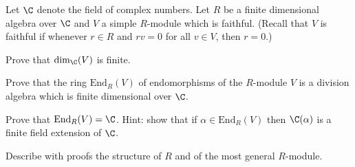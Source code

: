 Let $\C$ denote the field of complex numbers. Let $R$ be a finite
dimensional algebra over $\C$ and $V$ a simple $R$-module which is
faithful. (Recall that $V$ is faithful if whenever $r\in R$ and $rv=0$
for all $v\in V$, then $r=0$.)
\begin{alist}
\item Prove that $\dim_{\C}(V)$ is finite.
\item Prove that the ring $\text{End}_{R}(V)$ of endomorphisms of the
$R$-module $V$ is a division algebra which is finite dimensional over
$\C$.
\item Prove that $\text{End}_{R}(V)=\C$. Hint: show that if $\alpha\in
\text{End}_{R}(V)$ then $\C(\alpha)$ is a finite field extension of
$\C$.
\item Describe with proofs the structure of $R$ and of the most
general $R$-module.
\end{alist}
